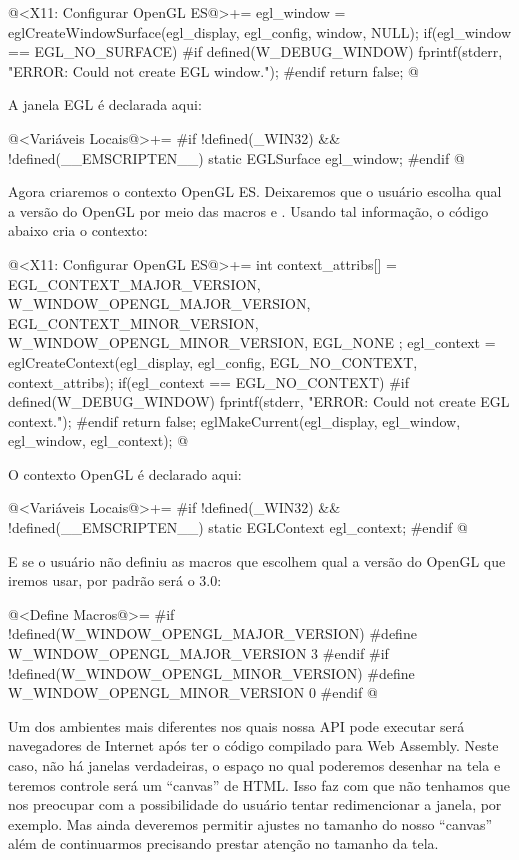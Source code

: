 \iniciocodigo
@<X11: Configurar OpenGL ES@>+=
egl_window = eglCreateWindowSurface(egl_display, egl_config, window,
                                    NULL);
if(egl_window == EGL_NO_SURFACE){
#if defined(W_DEBUG_WINDOW)
  fprintf(stderr, "ERROR: Could not create EGL window.\n");
#endif
  return false;
}
@
\fimcodigo

A janela EGL é declarada aqui:

\iniciocodigo
@<Variáveis Locais@>+=
#if !defined(_WIN32) && !defined(__EMSCRIPTEN__)
static EGLSurface egl_window;
#endif
@
\fimcodigo


Agora criaremos o contexto OpenGL ES. Deixaremos que o usuário escolha
qual a versão do OpenGL por meio das
macros  e
. Usando tal informação, o código abaixo cria o contexto:

\iniciocodigo
@<X11: Configurar OpenGL ES@>+=
{
  int context_attribs[] = {
    EGL_CONTEXT_MAJOR_VERSION, W_WINDOW_OPENGL_MAJOR_VERSION,
    EGL_CONTEXT_MINOR_VERSION, W_WINDOW_OPENGL_MINOR_VERSION,
    EGL_NONE
  };
  egl_context = eglCreateContext(egl_display, egl_config,
                                 EGL_NO_CONTEXT, context_attribs);
  if(egl_context == EGL_NO_CONTEXT){
#if defined(W_DEBUG_WINDOW)
    fprintf(stderr, "ERROR: Could not create EGL context.\n");
#endif
    return false;
  }
  eglMakeCurrent(egl_display, egl_window, egl_window, egl_context);
}
@
\fimcodigo

O contexto OpenGL é declarado aqui:

\iniciocodigo
@<Variáveis Locais@>+=
#if !defined(_WIN32) && !defined(__EMSCRIPTEN__)
static EGLContext egl_context;
#endif
@
\fimcodigo

E se o usuário não definiu as macros que escolhem qual a versão do
OpenGL que iremos usar, por padrão será o 3.0:

\iniciocodigo
@<Define Macros@>=
#if !defined(W_WINDOW_OPENGL_MAJOR_VERSION)
#define W_WINDOW_OPENGL_MAJOR_VERSION 3
#endif
#if !defined(W_WINDOW_OPENGL_MINOR_VERSION)
#define W_WINDOW_OPENGL_MINOR_VERSION 0
#endif
@
\fimcodigo



Um dos ambientes mais diferentes nos quais nossa API pode executar
será navegadores de Internet após ter o código compilado para Web
Assembly. Neste caso, não há janelas verdadeiras, o espaço no qual
poderemos desenhar na tela e teremos controle será um ``canvas'' de
HTML. Isso faz com que não tenhamos que nos preocupar com a
possibilidade do usuário tentar redimencionar a janela, por
exemplo. Mas ainda deveremos permitir ajustes no tamanho do nosso
``canvas'' além de continuarmos precisando prestar atenção no tamanho
da tela.

